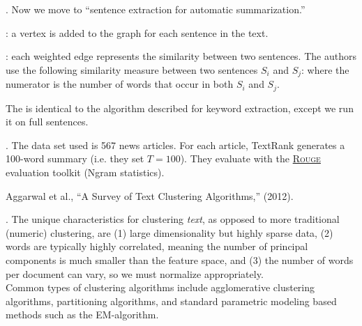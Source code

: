 \documentclass[11pt]{article}
\begin{document}
\myspace
{} 
\myspace 

\p {}. Now we move to ``sentence extraction for automatic summarization.''
\begin{compactitem}
	\item {}: a vertex is added to the graph for each sentence in the text.
	\item {}: each weighted edge represents the similarity between two sentences. The authors use the following similarity measure between two sentences $S_i$ and $S_j$:
		where the numerator is the number of words that occur in both $S_i$ and $S_j$. 
\end{compactitem}
The  is identical to the algorithm described for keyword extraction, except we run it on full sentences.

\myspace
\p {}. The data set used is 567 news articles. For each article, TextRank generates a 100-word summary (i.e. they set $T = 100$). They evaluate with the \href{http://www.isi.edu/licensed-sw/see/rouge/}{\textsc{Rouge}} evaluation toolkit (Ngram statistics). 




\vspace{-1em}
{\footnotesize Aggarwal et al., ``A Survey of Text Clustering Algorithms,'' (2012).}

\p {}. The unique characteristics for clustering \textit{text}, as opposed to more traditional (numeric) clustering, are (1) large dimensionality but highly sparse data, (2) words are typically highly correlated, meaning the number of principal components is much smaller than the feature space, and (3) the number of words per document can vary, so we must normalize appropriately.\\

\p Common types of clustering algorithms include agglomerative clustering algorithms, partitioning algorithms, and standard parametric modeling based methods such as the EM-algorithm.
\end{document}
